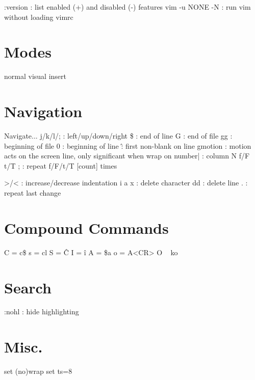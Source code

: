 \documentclass[twocolumn]{article}
\begin{document}


:version   : list enabled (+) and disabled (-) features
vim -u NONE -N  : run vim without loading vimrc

\section{Modes}
normal
visual
insert

\section{Navigation}
Navigate...
j/k/l/;  : left/up/down/right
\$  : end of line
G   : end of file
gg  : beginning of file
0   : beginning of line
\^  : first non-blank on line
g{motion} : motion acts on the screen line, only significant when wrap on
{number}|  : column N
f/F
t/T
;   : repeat f/F/t/T [count] times

>/<  : increase/decrease indentation
i
a
x  : delete character
dd  : delete line
.  : repeat last change

\section{Compound Commands}
C = c\$
s = cl
S = \^C
I = \^i
A = \$a
o = A<CR>
O ~ ko

\section{Search}
:nohl  : hide highlighting

\section{Misc.}
set (no)wrap
set ts=8
\end{document}
